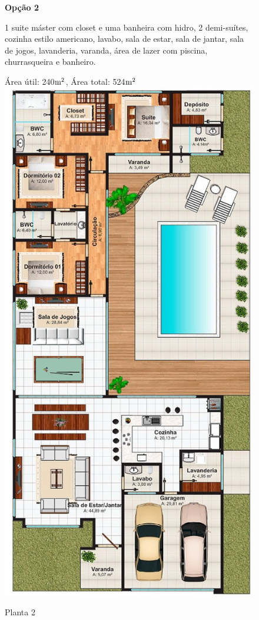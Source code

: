 \begin{figure}
\textbf{Opção 2}

	1 suite máster com closet e uma banheira com hidro, 2 demi-suítes, cozinha estilo americano, lavabo, sala de estar, sala de jantar, sala de jogos, lavanderia, varanda, área de lazer com piscina, churrasqueira e banheiro.

Área útil: 240$\textup{m}^{2}$, Área total: 524$\textup{m}^{2}$
\centering
\includegraphics[keepaspectratio,scale=0.5,angle=90]{images/planta2.jpg}
\caption{Planta 2\cite{planta2}}

\end{figure}

